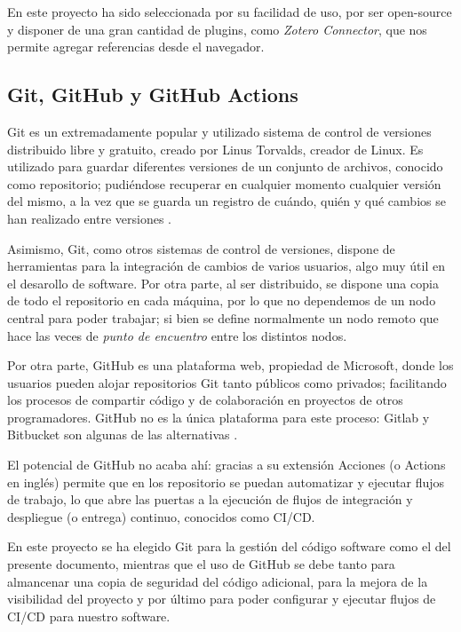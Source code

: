             En este proyecto ha sido seleccionada por su facilidad de uso, por ser open-source y disponer de una gran 
            cantidad de plugins, como \textit{Zotero Connector}, que nos permite agregar referencias desde el navegador.
        
        \subsection{Git, GitHub y GitHub Actions}
            Git es un extremadamente popular y utilizado sistema de control de versiones distribuido libre y gratuito,
            creado por Linus Torvalds, creador de Linux. Es utilizado para guardar diferentes versiones
            de un conjunto de archivos, conocido como repositorio; pudiéndose recuperar en cualquier momento
            cualquier versión del mismo, a la vez que se guarda un registro de cuándo, quién y qué cambios se han 
            realizado entre versiones \cite{atlassian_software_nodate}.

            Asimismo, Git, como otros sistemas de control de versiones, dispone de herramientas para la integración de
            cambios de varios usuarios, algo muy útil en el desarollo de software. Por otra parte, al ser distribuido,
            se dispone una copia de todo el repositorio en cada máquina, por lo que no dependemos de un nodo central
            para poder trabajar; si bien se define normalmente un nodo remoto que hace las veces de \textit{punto de
            encuentro} entre los distintos nodos. 

            Por otra parte, GitHub es una plataforma web, propiedad de Microsoft, donde los usuarios pueden alojar
            repositorios Git tanto públicos como privados; facilitando los procesos de compartir código y de 
            colaboración en proyectos de otros programadores. GitHub no es la única plataforma para este proceso: Gitlab
            y Bitbucket son algunas de las alternativas \cite{noauthor_git_2021}. 

            El potencial de GitHub no acaba ahí: gracias a su extensión Acciones (o Actions en inglés) permite que en
            los repositorio se puedan automatizar y ejecutar flujos de trabajo, lo que abre las puertas a la ejecución
            de flujos de integración y despliegue (o entrega) continuo, conocidos como CI/CD.

            En este proyecto se ha elegido Git para la gestión del código software como el del presente documento,
            mientras que el uso de GitHub se debe tanto para almancenar una copia de seguridad del código adicional, 
            para la mejora de la visibilidad del proyecto y por último para poder configurar y ejecutar flujos de CI/CD
            para nuestro software.


